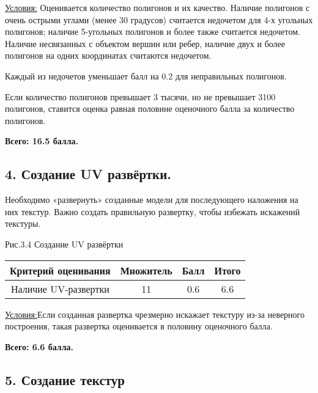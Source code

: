 \underline{Условия:} Оценивается количество полигонов и их качество. Наличие полигонов с очень острыми углами (менее 30 градусов) считается недочетом для 4-х угольных полигонов; наличие 5-угольных полигонов и более также считается недочетом. Наличие несвязанных с объектом вершин или ребер, наличие двух и более полигонов на одних координатах считаются недочетом. 

Каждый из недочетов уменьшает балл на 0.2 для неправильных полигонов.

Если количество полигонов превышает 3 тысячи, но не превышает 3100 полигонов, ставится оценка равная половине оценочного балла за количество полигонов.

\textbf{Всего: 16.5 балла.}

\subsection*{4. Создание UV развёртки. }

Необходимо «развернуть» созданные модели для последующего наложения на них текстур. Важно создать правильную развертку, чтобы избежать искажений текстуры.


\begin{center}
    Рис.3.4 Создание UV развёртки
\end{center}

\begin{table}[H]
    \begin{center}
        \begin{tabular}{|c|c|c|c|}
            \hline
            Критерий оценивания &	Множитель &	Балл &	Итого \\
            \hline
            Наличие UV-развертки &	11 &	0.6	& 6.6 \\       
            \hline
        \end{tabular} 
    \end {center} 
\end{table} 

\underline{Условия:}Если созданная развертка чрезмерно искажает текстуру из-за неверного построения, такая развертка оценивается в половину оценочного балла.

\textbf{Всего: 6.6 балла.}

\subsection*{5. Создание текстур}

